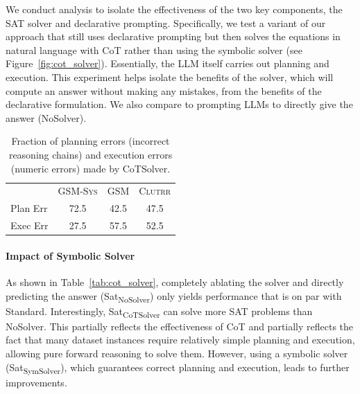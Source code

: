 \documentclass{article}
\theoremstyle{definition}
\newcommand{\gsm}{\textsc{GSM}}
\newcommand{\gsmsys}{\textsc{GSM-Sys}}
\newcommand{\clutrr}{\textsc{Clutrr}}
\begin{document}



We conduct analysis to isolate the effectiveness of the two key components, the SAT solver and declarative prompting. Specifically, we test a variant of our approach that still uses declarative prompting but then solves the equations in natural language with CoT rather than using the symbolic solver (see Figure~\ref{fig:cot_solver}). Essentially, the LLM itself carries out planning and execution. This experiment helps isolate the benefits of the solver, which will compute an answer without making any mistakes, from the benefits of the declarative formulation.  We also compare to prompting LLMs to directly give the answer ({\sc NoSolver}). %

\begin{table}
    \caption{Fraction of planning errors (incorrect reasoning chains) and execution errors (numeric errors) made by {\sc CoTSolver}. }
    \centering
    \footnotesize
    \begin{tabular}{lccc}
    \toprule
         & \gsmsys{} & \gsm{} & \clutrr{} \\
        \cmidrule{2-4} 
    \sc Plan Err  &  72.5 & 42.5 & 47.5 \\
    \sc Exec Err   & 27.5 & 57.5 & 52.5 \\
    \bottomrule
    \end{tabular}
    \label{tab:cotsolver_error}
\end{table} 


\paragraph{Impact of Symbolic Solver}  As shown in Table~\ref{tab:cot_solver}, completely ablating the solver and directly predicting the answer ({\sc Sat\textsubscript{NoSolver}}) only yields performance that is on par with {\sc Standard}.
Interestingly, {\sc Sat\textsubscript{CoTSolver}} can solve more SAT problems than {\sc NoSolver}. This partially reflects the effectiveness of CoT and partially reflects the fact that many dataset instances require relatively simple planning and execution, allowing pure forward reasoning to solve them. 
However, using a symbolic solver ({\sc Sat\textsubscript{SymSolver}}), which guarantees correct planning and execution, leads to further improvements. %
\end{document}

